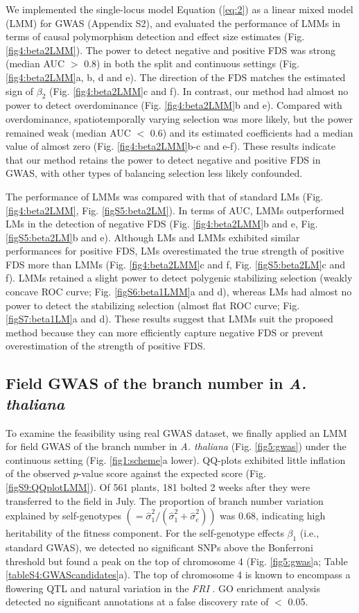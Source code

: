 \documentclass[12pt,]{article}
\begin{document}
We implemented the single-locus model Equation (\ref{eq:2}) as a linear mixed model (LMM) for GWAS (Appendix S2), and evaluated the performance of LMMs in terms of causal polymorphism detection and effect size estimates (Fig. \ref{fig4:beta2LMM}). The power to detect negative and positive FDS was strong (median AUC $>$ 0.8) in both the split and continuous settings (Fig. \ref{fig4:beta2LMM}a, b, d and e). The direction of the FDS matches the estimated sign of $\beta_2$ (Fig. \ref{fig4:beta2LMM}c and f). In contrast, our method had almost no power to detect overdominance (Fig. \ref{fig4:beta2LMM}b and e). Compared with overdominance, spatiotemporally varying selection was more likely, but the power remained weak (median AUC $<$ 0.6) and its estimated coefficients had a median value of almost zero (Fig. \ref{fig4:beta2LMM}b-c and e-f). These results indicate that our method retains the power to detect negative and positive FDS in GWAS, with other types of balancing selection less likely confounded. 

The performance of LMMs was compared with that of standard LMs (Fig. \ref{fig4:beta2LMM}, Fig. \ref{figS5:beta2LM}). In terms of AUC, LMMs outperformed LMs in the detection of negative FDS (Fig. \ref{fig4:beta2LMM}b and e, Fig. \ref{figS5:beta2LM}b and e). Although LMs and LMMs exhibited similar performances for positive FDS, LMs overestimated the true strength of positive FDS more than LMMs (Fig. \ref{fig4:beta2LMM}c and f, Fig. \ref{figS5:beta2LM}c and f). LMMs retained a slight power to detect polygenic stabilizing selection (weakly concave ROC curve; Fig. \ref{figS6:beta1LMM}a and d), whereas LMs had almost no power to detect the stabilizing selection (almost flat ROC curve; Fig. \ref{figS7:beta1LM}a and d). These results suggest that LMMs suit the proposed method because they can more efficiently capture negative FDS or prevent overestimation of the strength of positive FDS.

\subsection{Field GWAS of the branch number in \textit{A. thaliana}}
To examine the feasibility using real GWAS dataset, we finally applied an LMM for field GWAS of the branch number in \textit{A. thaliana} (Fig. \ref{fig5:gwas}) under the continuous setting (Fig. \ref{fig1:scheme}a lower). QQ-plots exhibited little inflation of the observed $p$-value score against the expected score (Fig. \ref{figS9:QQplotLMM}). Of 561 plants, 181 bolted 2 weeks after they were transferred to the field in July. The proportion of branch number variation explained by self-genotypes $(=\hat{\sigma}^2_1/(\hat{\sigma}^2_1 + \hat{\sigma}^2_e))$ was 0.68, indicating high heritability of the fitness component. For the self-genotype effects $\beta_1$ (i.e., standard GWAS), we detected no significant SNPs above the Bonferroni threshold but found a peak on the top of chromosome 4 (Fig. \ref{fig5:gwas}a; Table \ref{tableS4:GWAScandidates}a). The top of chromosome 4 is known to encompass a flowering QTL and natural variation in the \textit{FRI} \citep{aranzana2005genome}. GO enrichment analysis detected no significant annotations at a false discovery rate of $<$ 0.05. 
\end{document}
